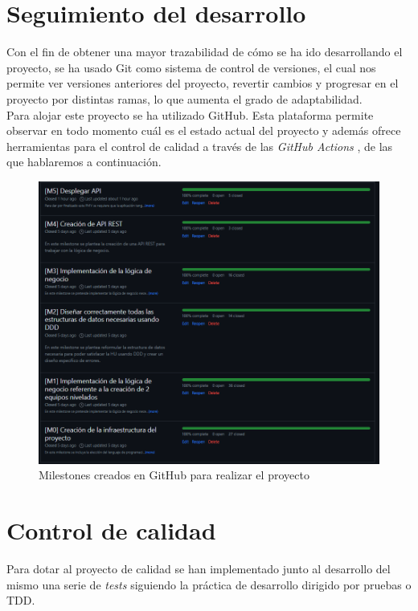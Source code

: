 \section{Seguimiento del desarrollo}

Con el fin de obtener una mayor trazabilidad de cómo se ha ido desarrollando el proyecto, se ha usado Git como sistema de control de versiones, el cual nos permite ver versiones anteriores
del proyecto, revertir cambios y progresar en el proyecto por distintas ramas, lo que aumenta el grado de adaptabilidad.\\

Para alojar este proyecto se ha utilizado GitHub. Esta plataforma permite observar en todo momento cuál es el estado actual del proyecto y además ofrece herramientas para el control de calidad
a través de las \textit{GitHub Actions} \cite{actions}, de las que hablaremos a continuación.

\begin{figure}[H]
	\centering	
	\includegraphics[scale=0.5]{img/milestones.png}
	\caption{Milestones creados en GitHub para realizar el proyecto}
\end{figure}


\section {Control de calidad}

Para dotar al proyecto de calidad se han implementado junto al desarrollo del mismo una serie de \textit{tests} siguiendo la práctica de desarrollo dirigido por pruebas o TDD.\\

